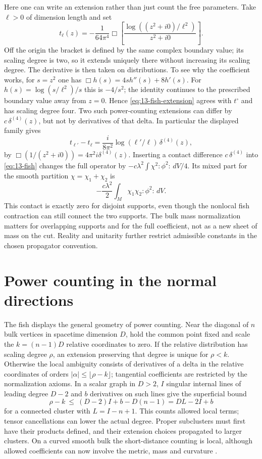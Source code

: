 Here one can write an extension rather than just count the free parameters.
Take $\ell>0$ of dimension length and set
\begin{equation}
 t_\ell(z)=-\frac{1}{64\pi^4}\Box
 \left[\frac{\log((z^2+i0)/\ell^2)}{z^2+i0}\right].
 \label{eq:13-fish-extension}
\end{equation}
Off the origin the bracket is defined by the same complex boundary value;
its scaling degree is two, so it extends uniquely there without increasing
its scaling degree. The derivative is then taken on distributions. To see
why the coefficient works, for $s=z^2$ one has
$\Box h(s)=4s h''(s)+8h'(s)$. For $h(s)=\log(s/\ell^2)/s$ this is
$-4/s^2$; the identity continues to the prescribed boundary value away
from $z=0$. Hence \eqref{eq:13-fish-extension} agrees with $t^\circ$ and
has scaling degree four. Two such power-counting extensions can differ by
$c\,\delta^{(4)}(z)$, but not by derivatives of that delta. In particular
the displayed family gives
\[
 t_{\ell'}-t_\ell=\frac{i}{8\pi^2}
       \log(\ell'/\ell)\,\delta^{(4)}(z),
\]
by $\Box(1/(z^2+i0))=4\pi^2 i\delta^{(4)}(z)$. Inserting a contact
difference $c\,\delta^{(4)}$ into \eqref{eq:13-fish} changes the full
operator by $-c\lambda^2\int\chi^2:\!\phi^2\!:\,dV/4$. Its mixed part
for the smooth partition $\chi=\chi_1+\chi_2$ is
\[
 -\frac{c\lambda^2}{2}\int_M\chi_1\chi_2:\!\phi^2\!:\,dV .
\]
This contact is exactly zero for disjoint supports, even though the
nonlocal fish contraction can still connect the two supports. The bulk
mass normalization matters for overlapping supports and for the full
coefficient, not as a new sheet of mass on the cut. Reality and unitarity
further restrict admissible constants in the chosen propagator convention.

\section{Power counting in the normal directions}
The fish displays the general geometry of power counting. Near the diagonal
of $n$ bulk vertices in spacetime dimension $D$, hold the common point
fixed and scale the $k=(n-1)D$ relative coordinates to zero. If the
relative distribution has scaling degree $\rho$, an extension preserving
that degree is unique for $\rho<k$. Otherwise the local ambiguity consists
of derivatives of a delta in the relative coordinates of orders
$|\alpha|\le\lfloor\rho-k\rfloor$; tangential coefficients are restricted
by the normalization axioms. In a scalar graph in $D>2$, $I$ singular
internal lines of leading degree $D-2$ and $b$ derivatives on such lines
give the superficial bound
\[
 \rho-k\ \le\ (D-2)I+b-D(n-1)=D L-2I+b
\]
for a connected cluster with $L=I-n+1$. This counts allowed local terms;
tensor cancellations can lower the actual degree. Proper subclusters must
first have their products defined, and their extension choices propagated
to larger clusters. On a curved smooth bulk the short-distance counting
is local, although allowed coefficients can now involve the metric, mass
and curvature \cite{HWick,HWT}.

